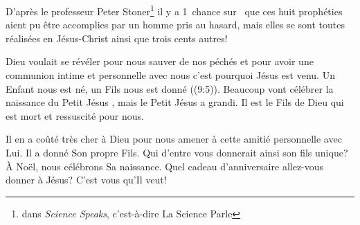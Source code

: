 D'après le professeur Peter Stoner\footnote{dans \emph{Science Speaks}, c'est-à-dire \Og La Science Parle \Fg{}} il y a 1~chance sur~ que ces huit prophéties aient pu être accomplies par un homme pris au hasard, mais elles se sont toutes réalisées en Jésus-Christ ainsi que trois cents autres!

Dieu voulait se révéler pour nous sauver de nos péchés et pour avoir une communion intime et personnelle avec nous\frcolon{} c'est pourquoi Jésus est venu. \Og Un Enfant nous est né, un Fils nous est donné \Fg{} ((9:5)). Beaucoup vont célébrer la naissance du \Og Petit Jésus \Fg{}, mais le \Og Petit Jésus \Fg{} a grandi. Il est le Fils de Dieu qui est mort et ressuscité pour nous.

Il en a coûté très cher à Dieu pour nous amener à cette amitié personnelle avec Lui. Il a donné Son propre Fils. Qui d'entre vous donnerait ainsi son fils unique? À Noël, nous célébrons Sa naissance. Quel cadeau d'anniversaire allez-vous donner à Jésus? C'est vous qu'Il veut!


